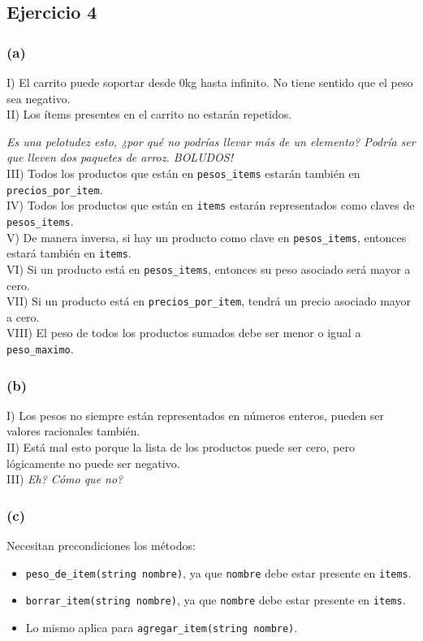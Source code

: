 \documentclass[12 pt]{article}
\begin{document}
\subsection*{Ejercicio 4}
    \subsubsection*{(a)}
        I) El carrito puede soportar desde 0kg hasta infinito. No tiene sentido que el peso sea negativo.
        \\
        II) Los ítems presentes en el carrito no estarán repetidos.
        
        \textit{Es una pelotudez esto, ¿por qué no podrías llevar más de un elemento? Podría ser que lleven dos paquetes de arroz. BOLUDOS!}
        \\
        III) Todos los productos que están en \texttt{pesos\_items} estarán también en \texttt{precios\_por\_item}.
        \\
        IV) Todos los productos que están en \texttt{items} estarán representados como claves de \texttt{pesos\_items}.
        \\
        V) De manera inversa, si hay un producto como clave en \texttt{pesos\_items}, entonces estará también en \texttt{items}.
        \\
        VI) Si un producto está en \texttt{pesos\_items}, entonces su peso asociado será mayor a cero.
        \\
        VII) Si un producto está en \texttt{precios\_por\_item}, tendrá un precio asociado mayor a cero.
        \\
        VIII) El peso de todos los productos sumados debe ser menor o igual a \texttt{peso\_maximo}.

    \subsubsection*{(b)}
        I) Los pesos no siempre están representados en números enteros, pueden ser valores racionales también.
        \\
        II) Está mal esto porque la lista de los productos puede ser cero, pero lógicamente no puede ser negativo.
        \\
        III) \textit{Eh? Cómo que no?}

    \subsubsection*{(c)}
        Necesitan precondiciones los métodos:
        \begin{itemize}
            \item \texttt{peso\_de\_item(string nombre)}, ya que \texttt{nombre} debe estar presente en \texttt{items}.
            \item \texttt{borrar\_item(string nombre)}, ya que \texttt{nombre} debe estar presente en \texttt{items}.
            \item Lo mismo aplica para \texttt{agregar\_item(string nombre)}.
        \end{itemize}
\end{document}
